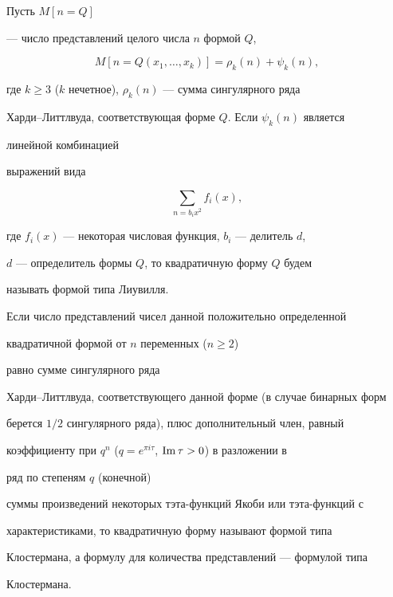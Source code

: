 \begin{defn} Пусть $M[n=Q]$


--- число представлений целого числа $n$ формой $Q$,


$$


M[n=Q(x_1,\dotsc,x_k)]=\rho_k(n)+\psi_k(n),


$$


где $k\ge 3$ ($k$ нечетное), $\rho_k(n)$ --- сумма сингулярного ряда


Харди--Литтлвуда, соответствующая форме $Q$. Если $\psi_k(n)$ является


линейной комбинацией


выражений вида


$$


\sum_{n=b_i x^2}f_i(x),


$$


где $f_i(x)$ --- некоторая числовая функция, $b_i$ --- делитель $d$,


$d$ --- определитель формы $Q$, то квадратичную форму $Q$ будем


называть формой типа Лиувилля.


\end{defn}





\begin{defn}


Если число представлений чисел данной положительно определенной


квадратичной формой от $n$ переменных ($n\ge 2$)


равно сумме сингулярного ряда


Харди--Литтлвуда, соответствующего данной форме (в случае бинарных форм


берется $1/2$ сингулярного ряда), плюс дополнительный член, равный


коэффициенту при $q^n$ ($q=e^{\pi i\tau}$, $\operatorname{Im}\tau>0$) в разложении в


ряд по степеням $q$ (конечной)


суммы произведений некоторых тэта-функций Якоби или тэта-функций с


характеристиками, то квадратичную форму называют формой типа


Клостермана, а формулу для количества представлений --- формулой типа


Клостермана.


\end{defn}





